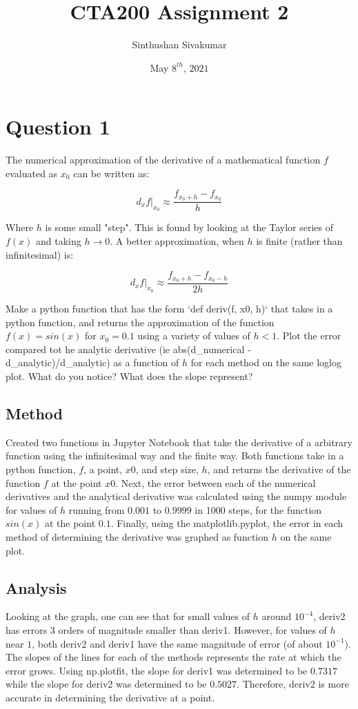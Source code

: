 \documentclass[12pt]{article}
\title{CTA200 Assignment 2}
\author{Sinthushan Sivakumar}
\date{May $8^{th}$, $2021$}
\begin{document}
\maketitle

\section{Question 1}
The numerical approximation of the derivative of a mathematical function $f$ evaluated as $x_{0}$ can be written as:

$$d_{x}f|_{x_{0}} \approx \frac{f_{x_{0}+h} - f_{x_{0}}}{h}$$

Where $h$ is some small "step". This is found by looking at the Taylor series of $f(x)$ and taking $h \rightarrow 0$. A better approximation, when $h$ is finite (rather than infinitesimal) is:

$$d_{x}f|_{x_{0}} \approx \frac{f_{x_{0}+h} - f_{x_{0}-h}}{2h}$$

Make a python function that has the form `def deriv(f, x0, h)` that takes in a python function, and returns the approximation of the function $f(x)=sin(x)$ for $x_{0}=0.1$ using a variety of values of $h<1$. Plot the error compared tot he analytic derivative (ie abs(d\_numerical - d\_analytic)/d\_analytic) as a function of $h$ for each method on the same loglog plot. What do you notice? What does the slope represent?

\subsection{Method}
Created two functions in Jupyter Notebook that take the derivative of a arbitrary function using the infinitesimal way and the finite way. Both functions take in a python function, $f$, a point, $x0$, and step size, $h$, and returns the derivative of the function $f$ at the point $x0$. Next, the error between each of the numerical derivatives and the analytical derivative was calculated using the numpy module for values of $h$ running from $0.001$
 to $0.9999$ in 1000 steps, for the function $sin(x)$ at the point $0.1$. Finally, using the matplotlib.pyplot, the error in each method of determining the derivative was graphed as function $h$ on the same plot. 
 
 \subsection{Analysis}
 Looking at the graph, one can see that for small values of $h$ around $10^{-4}$, deriv2 has errors $3$ orders of magnitude smaller than deriv1. However, for values of $h$ near $1$, both deriv2 and deriv1 have the same magnitude of error (of about $10^{-1}$). 
 The slopes of the lines for each of the methods represents the rate at which the error grows. Using np.plotfit, the slope for deriv1 was determined to be $0.7317$ while the slope for deriv2 was determined to be $0.5027$. Therefore, deriv2 is more accurate in determining the derivative at a point.
 
\end{document}
